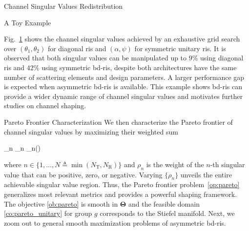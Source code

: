 \documentclass[journal]{IEEEtran}
\begin{document}
\begin{section}{Channel Singular Values Redistribution}
\begin{subsection}{A Toy Example}
\begin{figure}
			\label{fg:singular_trend}
		\end{figure}
		Fig.~\ref{fg:singular_trend} shows the channel singular values achieved by an exhaustive grid search over $(\theta_1, \theta_2)$ for diagonal \gls{ris} and $(\alpha, \psi)$ for symmetric unitary \gls{ris}.
		It is observed that both singular values can be manipulated up to $9\%$ using diagonal \gls{ris} and $42\%$ using symmetric \gls{bd}-\gls{ris}, despite both architectures have the same number of scattering elements and design parameters.
		A larger performance gap is expected when asymmetric \gls{bd}-\gls{ris} is available.
		This example shows \gls{bd}-\gls{ris} can provide a wider dynamic range of channel singular values and motivates further studies on channel shaping.
	\end{subsection}

	\begin{subsection}{Pareto Frontier Characterization}
		We then characterize the Pareto frontier of channel singular values by maximizing their weighted sum
		\begin{maxi!}
			{\scriptstyle{\mathbf{\Theta}}}{\sum_n \rho_n \sigma_n()}{\label{op:pareto}}{\label{ob:pareto}}
		\end{maxi!}
		where $n \in \{1,\ldots,N \triangleq \min(N_\mathrm{T}, N_\mathrm{R})\}$ and $\rho_n$ is the weight of the $n$-th singular value that can be positive, zero, or negative.
		Varying $\{\rho_n\}$ unveils the entire achievable singular value region.
		Thus, the Pareto frontier problem~\eqref{op:pareto} generalizes most relevant metrics and provides a powerful shaping framework.
		The objective \eqref{ob:pareto} is smooth in $\mathbf{\Theta}$ and the feasible domain \eqref{co:pareto_unitary} for group $g$ corresponds to the Stiefel manifold.
		Next, we zoom out to general smooth maximization problems of asymmetric \gls{bd}-\gls{ris}.


\end{subsection}
\end{section}
\end{document}

